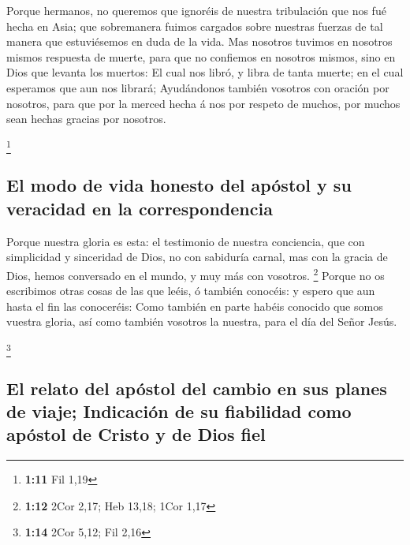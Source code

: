  Porque hermanos, no queremos que ignoréis de nuestra
tribulación que nos fué hecha en Asia; que sobremanera fuimos cargados
sobre nuestras fuerzas de tal manera que estuviésemos en duda de la
vida.  Mas nosotros tuvimos en nosotros mismos respuesta
de muerte, para que no confiemos en nosotros mismos, sino en Dios que
levanta los muertos:  El cual nos libró, y libra de tanta
muerte; en el cual esperamos que aun nos librará; 
Ayudándonos también vosotros con oración por nosotros, para que por la
merced hecha á nos por respeto de muchos, por muchos sean hechas gracias
por nosotros.

\footnote{\textbf{1:11} Fil 1,19}

\hypertarget{el-modo-de-vida-honesto-del-apuxf3stol-y-su-veracidad-en-la-correspondencia}{%
\subsection{El modo de vida honesto del apóstol y su veracidad en la
correspondencia}\label{el-modo-de-vida-honesto-del-apuxf3stol-y-su-veracidad-en-la-correspondencia}}

 Porque nuestra gloria es esta: el testimonio de nuestra
conciencia, que con simplicidad y sinceridad de Dios, no con sabiduría
carnal, mas con la gracia de Dios, hemos conversado en el mundo, y muy
más con vosotros. \footnote{\textbf{1:12} 2Cor 2,17; Heb 13,18; 1Cor
  1,17}  Porque no os escribimos otras cosas de las que
leéis, ó también conocéis: y espero que aun hasta el fin las conoceréis:
 Como también en parte habéis conocido que somos vuestra
gloria, así como también vosotros la nuestra, para el día del Señor
Jesús.

\footnote{\textbf{1:14} 2Cor 5,12; Fil 2,16}

\hypertarget{el-relato-del-apuxf3stol-del-cambio-en-sus-planes-de-viaje-indicaciuxf3n-de-su-fiabilidad-como-apuxf3stol-de-cristo-y-de-dios-fiel}{%
\subsection{El relato del apóstol del cambio en sus planes de viaje;
Indicación de su fiabilidad como apóstol de Cristo y de Dios
fiel}\label{el-relato-del-apuxf3stol-del-cambio-en-sus-planes-de-viaje-indicaciuxf3n-de-su-fiabilidad-como-apuxf3stol-de-cristo-y-de-dios-fiel}}

